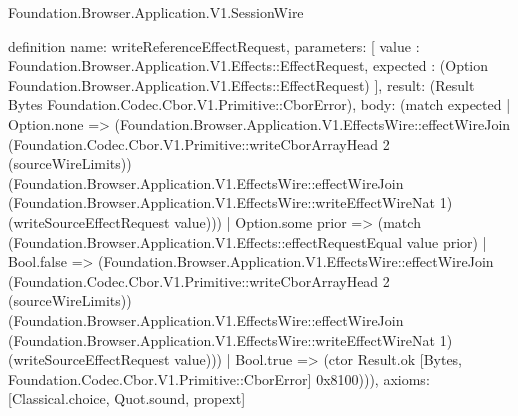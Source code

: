 \begin{lexlean}{Foundation.Browser.Application.V1.SessionWire}
\begin{semanticmodule}
definition{
  name: writeReferenceEffectRequest,
  parameters: [
    value : Foundation.Browser.Application.V1.Effects::EffectRequest,
    expected : (Option Foundation.Browser.Application.V1.Effects::EffectRequest)
  ],
  result: (Result Bytes Foundation.Codec.Cbor.V1.Primitive::CborError),
  body: (match expected
    | Option.none => (Foundation.Browser.Application.V1.EffectsWire::effectWireJoin (Foundation.Codec.Cbor.V1.Primitive::writeCborArrayHead 2 (sourceWireLimits)) (Foundation.Browser.Application.V1.EffectsWire::effectWireJoin (Foundation.Browser.Application.V1.EffectsWire::writeEffectWireNat 1) (writeSourceEffectRequest value)))
    | Option.some prior => (match (Foundation.Browser.Application.V1.Effects::effectRequestEqual value prior)
      | Bool.false => (Foundation.Browser.Application.V1.EffectsWire::effectWireJoin (Foundation.Codec.Cbor.V1.Primitive::writeCborArrayHead 2 (sourceWireLimits)) (Foundation.Browser.Application.V1.EffectsWire::effectWireJoin (Foundation.Browser.Application.V1.EffectsWire::writeEffectWireNat 1) (writeSourceEffectRequest value)))
      | Bool.true => (ctor Result.ok [Bytes, Foundation.Codec.Cbor.V1.Primitive::CborError] 0x8100))),
  axioms: [Classical.choice, Quot.sound, propext]
}


\end{semanticmodule}
\end{lexlean}
